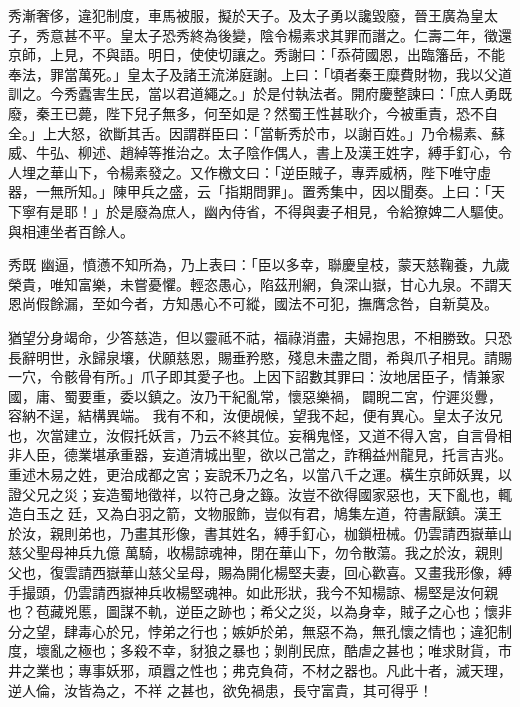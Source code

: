 \begin{pinyinscope}
 秀漸奢侈，違犯制度，車馬被服，擬於天子。及太子勇以讒毀廢，晉王廣為皇太子，秀意甚不平。皇太子恐秀終為後變，陰令楊素求其罪而譖之。仁壽二年，徵還京師，上見，不與語。明日，使使切讓之。秀謝曰：「忝荷國恩，出臨籓岳，不能奉法，罪當萬死。」皇太子及諸王流涕庭謝。上曰：「頃者秦王糜費財物，我以父道
 訓之。今秀蠹害生民，當以君道繩之。」於是付執法者。開府慶整諫曰：「庶人勇既廢，秦王已薨，陛下兒子無多，何至如是？然蜀王性甚耿介，今被重責，恐不自全。」上大怒，欲斷其舌。因謂群臣曰：「當斬秀於市，以謝百姓。」乃令楊素、蘇威、牛弘、柳述、趙綽等推治之。太子陰作偶人，書上及漢王姓字，縛手釘心，令人埋之華山下，令楊素發之。又作檄文曰：「逆臣賊子，專弄威柄，陛下唯守虛器，一無所知。」陳甲兵之盛，云「指期問罪」。置秀集中，因以聞奏。上曰：「天下寧有是耶！」於是廢為庶人，幽內侍省，不得與妻子相見，令給獠婢二人驅使。與相連坐者百餘人。



 秀既
 幽逼，憤懣不知所為，乃上表曰：「臣以多幸，聯慶皇枝，蒙天慈鞠養，九歲榮貴，唯知富樂，未嘗憂懼。輕恣愚心，陷茲刑網，負深山嶽，甘心九泉。不謂天恩尚假餘漏，至如今者，方知愚心不可縱，國法不可犯，撫膺念咎，自新莫及。



 猶望分身竭命，少答慈造，但以靈祗不祜，福祿消盡，夫婦抱思，不相勝致。只恐長辭明世，永歸泉壤，伏願慈恩，賜垂矜愍，殘息未盡之間，希與爪子相見。請賜一穴，令骸骨有所。」爪子即其愛子也。上因下詔數其罪曰：汝地居臣子，情兼家國，庸、蜀要重，委以鎮之。汝乃干紀亂常，懷惡樂禍，闢睨二宮，佇遲災釁，容納不逞，結構異端。
 我有不和，汝便覘候，望我不起，便有異心。皇太子汝兄也，次當建立，汝假托妖言，乃云不終其位。妄稱鬼怪，又道不得入宮，自言骨相非人臣，德業堪承重器，妄道清城出聖，欲以己當之，詐稱益州龍見，托言吉兆。重述木易之姓，更治成都之宮；妄說禾乃之名，以當八千之運。橫生京師妖異，以證父兄之災；妄造蜀地徵祥，以符己身之籙。汝豈不欲得國家惡也，天下亂也，輒造白玉之廷，又為白羽之箭，文物服飾，豈似有君，鳩集左道，符書厭鎮。漢王於汝，親則弟也，乃畫其形像，書其姓名，縛手釘心，枷鎖杻械。仍雲請西嶽華山慈父聖母神兵九億
 萬騎，收楊諒魂神，閉在華山下，勿令散蕩。我之於汝，親則父也，復雲請西嶽華山慈父呈母，賜為開化楊堅夫妻，回心歡喜。又畫我形像，縛手撮頭，仍雲請西嶽神兵收楊堅魂神。如此形狀，我今不知楊諒、楊堅是汝何親也？苞藏兇慝，圖謀不軌，逆臣之跡也；希父之災，以為身幸，賊子之心也；懷非分之望，肆毒心於兄，悖弟之行也；嫉妒於弟，無惡不為，無孔懷之情也；違犯制度，壞亂之極也；多殺不幸，豺狼之暴也；剝削民庶，酷虐之甚也；唯求財貨，市井之業也；專事妖邪，頑囂之性也；弗克負荷，不材之器也。凡此十者，滅天理，逆人倫，汝皆為之，不祥
 之甚也，欲免禍患，長守富貴，其可得乎！




\end{pinyinscope}

